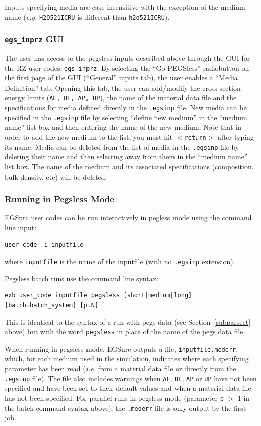 \documentclass[12pt,twoside]{article}  %
\begin{document}
Inputs specifying media are case insensitive with the exception of the medium name ({\it e.g.} {\tt H2O521ICRU} is
different than {\tt h2o521ICRU}).

\subsubsection{{\tt egs\_inprz} GUI}
The user has access to the pegsless inputs described above through the GUI for the RZ user codes, {\tt egs\_inprz}.
By selecting the ``Go PEGSless'' radiobutton on the first page of the GUI (``General'' inputs tab), the user enables
a ``Media Definition'' tab.  Opening this tab, the user can add/modify the cross section energy limits ({\tt AE, UE, AP, UP}),
the name of the material data file and the specifications for media defined directly in the {\tt .egsinp} file.  New media
can be specified in the {\tt .egsinp} file by selecting ``define new medium'' in the ``medium name'' list box and then entering the
name of the new medium.  Note that in order to add the new medium to the list, you must hit {\tt $<$return$>$} after
typing its name.  Media can be deleted from the list of media in the {\tt .egsinp} file by deleting their name and then
selecting away from them in the ``medium name'' list box.  The name of the medium and its associated specifications
(composition, bulk density, etc) will be deleted.

\subsubsection{Running in Pegsless Mode}

EGSnrc user codes can be run interactively in pegless mode using the command line input:
\begin{verbatim}
user_code -i inputfile
\end{verbatim}
where {\tt inputfile} is the name of the inputfile (with no
{\tt .egsinp} extension).

Pegsless batch runs use the command line syntax:
\begin{verbatim}
exb user_code inputfile pegsless [short|medium|long] [batch=batch_system] [p=N]
\end{verbatim}
This is identical to the syntax of a run with pegs data (see Section~\ref{subparsect} above) but
with the word {\tt pegsless} in place of the name of the pegs data file.

When running in pegsless mode, EGSnrc outputs a file, {\tt inputfile.mederr}, which, for each medium used
in the simulation, indicates where each specifying parameter has been read ({\it i.e.} from a material data
file or directly from the {\tt .egsinp} file).  The file also includes warnings when {\tt AE}, {\tt UE},
{\tt AP} or {\tt UP} have not been specified and have been set to their default values and when a material
data file has not been specified.  For parallel runs in pegsless mode (parameter {\tt p} $>$ 1 in the batch
command syntax above), the {\tt .mederr} file is only output by the first job.
\end{document}
